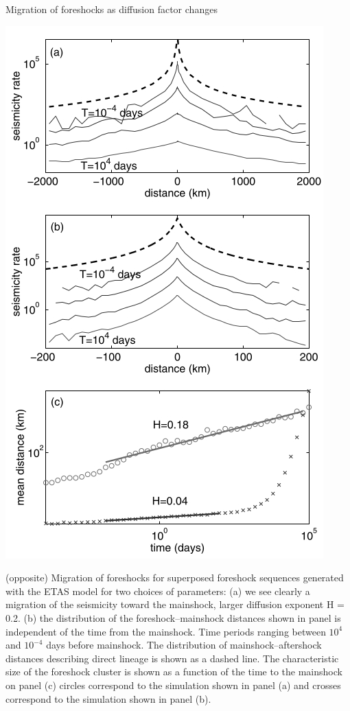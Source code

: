 \documentclass[aspectratio=43,9pt]{beamer}
\begin{document}
\begin{frame}
 {Migration of foreshocks as diffusion factor changes}
 
 \begin{minipage}{0.48\linewidth}
   \includegraphics[width=0.8\linewidth]{Figs/fig9}
 \end{minipage}
 \begin{minipage}{0.48\linewidth}
  (opposite) Migration of foreshocks for superposed foreshock sequences
  generated with the ETAS model for two choices of parameters: 
  (a) we see clearly a migration of the seismicity toward the mainshock, 
  larger diffusion exponent H = 0.2. (b) the distribution of the foreshock–mainshock
  distances shown in panel is independent of the time from the mainshock.
  Time periods ranging between $10^{4}$ and $10^{-4}$ days before mainshock.
  The distribution of mainshock–aftershock distances describing direct 
  lineage is shown as a dashed line. The characteristic size
  of the foreshock cluster is shown as a function of the time to
  the mainshock on panel (c) circles correspond to the simulation 
  shown in panel (a) and crosses correspond to the simulation shown in
  panel (b).
 \end{minipage}

\end{frame}
\end{document}
